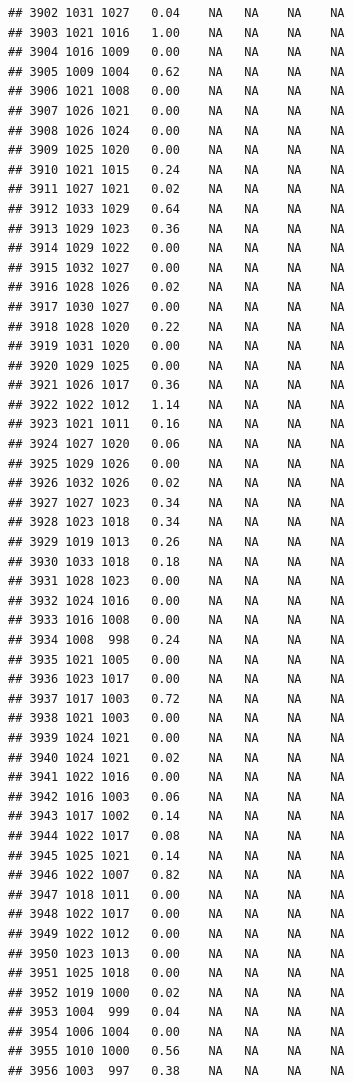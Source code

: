 \documentclass{article}\usepackage{graphicx, color}
\makeatletter
\newenvironment{kframe}{%
 \def\at@end@of@kframe{}%
 \ifinner\ifhmode%
  \def\at@end@of@kframe{\end{minipage}}%
  \begin{minipage}{\columnwidth}%
 \fi\fi%
 \def\FrameCommand##1{\hskip\@totalleftmargin \hskip-\fboxsep
 \colorbox{shadecolor}{##1}\hskip-\fboxsep
     \hskip-\linewidth \hskip-\@totalleftmargin \hskip\columnwidth}%
 \MakeFramed {\advance\hsize-\width
   \@totalleftmargin\z@ \linewidth\hsize
   \@setminipage}}%
 {\par\unskip\endMakeFramed%
 \at@end@of@kframe}
\newenvironment{knitrout}{}{} %
\makeatother
\begin{document}
\begin{knitrout}
\begin{kframe}
\begin{verbatim}
## 3902 1031 1027   0.04    NA   NA    NA    NA
## 3903 1021 1016   1.00    NA   NA    NA    NA
## 3904 1016 1009   0.00    NA   NA    NA    NA
## 3905 1009 1004   0.62    NA   NA    NA    NA
## 3906 1021 1008   0.00    NA   NA    NA    NA
## 3907 1026 1021   0.00    NA   NA    NA    NA
## 3908 1026 1024   0.00    NA   NA    NA    NA
## 3909 1025 1020   0.00    NA   NA    NA    NA
## 3910 1021 1015   0.24    NA   NA    NA    NA
## 3911 1027 1021   0.02    NA   NA    NA    NA
## 3912 1033 1029   0.64    NA   NA    NA    NA
## 3913 1029 1023   0.36    NA   NA    NA    NA
## 3914 1029 1022   0.00    NA   NA    NA    NA
## 3915 1032 1027   0.00    NA   NA    NA    NA
## 3916 1028 1026   0.02    NA   NA    NA    NA
## 3917 1030 1027   0.00    NA   NA    NA    NA
## 3918 1028 1020   0.22    NA   NA    NA    NA
## 3919 1031 1020   0.00    NA   NA    NA    NA
## 3920 1029 1025   0.00    NA   NA    NA    NA
## 3921 1026 1017   0.36    NA   NA    NA    NA
## 3922 1022 1012   1.14    NA   NA    NA    NA
## 3923 1021 1011   0.16    NA   NA    NA    NA
## 3924 1027 1020   0.06    NA   NA    NA    NA
## 3925 1029 1026   0.00    NA   NA    NA    NA
## 3926 1032 1026   0.02    NA   NA    NA    NA
## 3927 1027 1023   0.34    NA   NA    NA    NA
## 3928 1023 1018   0.34    NA   NA    NA    NA
## 3929 1019 1013   0.26    NA   NA    NA    NA
## 3930 1033 1018   0.18    NA   NA    NA    NA
## 3931 1028 1023   0.00    NA   NA    NA    NA
## 3932 1024 1016   0.00    NA   NA    NA    NA
## 3933 1016 1008   0.00    NA   NA    NA    NA
## 3934 1008  998   0.24    NA   NA    NA    NA
## 3935 1021 1005   0.00    NA   NA    NA    NA
## 3936 1023 1017   0.00    NA   NA    NA    NA
## 3937 1017 1003   0.72    NA   NA    NA    NA
## 3938 1021 1003   0.00    NA   NA    NA    NA
## 3939 1024 1021   0.00    NA   NA    NA    NA
## 3940 1024 1021   0.02    NA   NA    NA    NA
## 3941 1022 1016   0.00    NA   NA    NA    NA
## 3942 1016 1003   0.06    NA   NA    NA    NA
## 3943 1017 1002   0.14    NA   NA    NA    NA
## 3944 1022 1017   0.08    NA   NA    NA    NA
## 3945 1025 1021   0.14    NA   NA    NA    NA
## 3946 1022 1007   0.82    NA   NA    NA    NA
## 3947 1018 1011   0.00    NA   NA    NA    NA
## 3948 1022 1017   0.00    NA   NA    NA    NA
## 3949 1022 1012   0.00    NA   NA    NA    NA
## 3950 1023 1013   0.00    NA   NA    NA    NA
## 3951 1025 1018   0.00    NA   NA    NA    NA
## 3952 1019 1000   0.02    NA   NA    NA    NA
## 3953 1004  999   0.04    NA   NA    NA    NA
## 3954 1006 1004   0.00    NA   NA    NA    NA
## 3955 1010 1000   0.56    NA   NA    NA    NA
## 3956 1003  997   0.38    NA   NA    NA    NA

\end{verbatim}
\end{kframe}
\end{knitrout}
\end{document}
